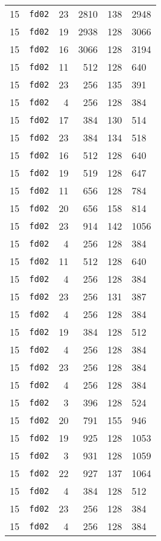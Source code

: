 \documentclass{article}
\begin{document}
\begin{table}[h!]
\begin{tabular}{llrrrl}
    15 & \texttt{fd02} & 23 & 2810 & 138 & 2948 \\
    15 & \texttt{fd02} & 19 & 2938 & 128 & 3066 \\
    15 & \texttt{fd02} & 16 & 3066 & 128 & 3194 \\
    15 & \texttt{fd02} & 11 & 512 & 128 & 640 \\
    15 & \texttt{fd02} & 23 & 256 & 135 & 391 \\
    15 & \texttt{fd02} & 4 & 256 & 128 & 384 \\
    15 & \texttt{fd02} & 17 & 384 & 130 & 514 \\
    15 & \texttt{fd02} & 23 & 384 & 134 & 518 \\
    15 & \texttt{fd02} & 16 & 512 & 128 & 640 \\
    15 & \texttt{fd02} & 19 & 519 & 128 & 647 \\
    15 & \texttt{fd02} & 11 & 656 & 128 & 784 \\
    15 & \texttt{fd02} & 20 & 656 & 158 & 814 \\
    15 & \texttt{fd02} & 23 & 914 & 142 & 1056 \\
    15 & \texttt{fd02} & 4 & 256 & 128 & 384 \\
    15 & \texttt{fd02} & 11 & 512 & 128 & 640 \\
    15 & \texttt{fd02} & 4 & 256 & 128 & 384 \\
    15 & \texttt{fd02} & 23 & 256 & 131 & 387 \\
    15 & \texttt{fd02} & 4 & 256 & 128 & 384 \\
    15 & \texttt{fd02} & 19 & 384 & 128 & 512 \\
    15 & \texttt{fd02} & 4 & 256 & 128 & 384 \\
    15 & \texttt{fd02} & 23 & 256 & 128 & 384 \\
    15 & \texttt{fd02} & 4 & 256 & 128 & 384 \\
    15 & \texttt{fd02} & 3 & 396 & 128 & 524 \\
    15 & \texttt{fd02} & 20 & 791 & 155 & 946 \\
    15 & \texttt{fd02} & 19 & 925 & 128 & 1053 \\
    15 & \texttt{fd02} & 3 & 931 & 128 & 1059 \\
    15 & \texttt{fd02} & 22 & 927 & 137 & 1064 \\
    15 & \texttt{fd02} & 4 & 384 & 128 & 512 \\
    15 & \texttt{fd02} & 23 & 256 & 128 & 384 \\
    15 & \texttt{fd02} & 4 & 256 & 128 & 384 \\

\end{tabular}
\end{table}
\end{document}
